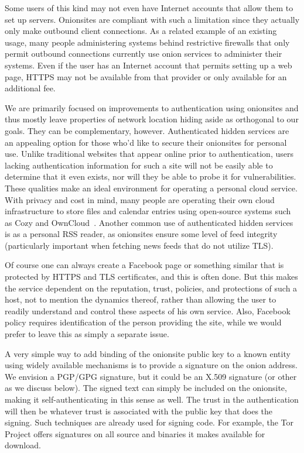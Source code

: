 \documentclass[10pt, conference, compsocconf]{styles/IEEEtran}
\begin{document}
Some users of this kind may not even have Internet accounts that allow 
them to set up servers. Onionsites are compliant with such a limitation
since they actually only make outbound client connections. As a related
example of an existing usage, many people administering systems
behind restrictive firewalls that only permit outbound connections
currently use onion services to administer their systems.  Even if the
user has an Internet account that permits setting up a web page, HTTPS
may not be available from that provider or only available for an
additional fee.

We are primarily focused on improvements to authentication using
onionsites and thus mostly leave properties of network location hiding
aside as orthogonal to our goals. They can be complementary, however.
Authenticated hidden services are an appealing option for those
who'd like to secure their onionsites for personal use.  Unlike
traditional websites that appear online prior to authentication,
users lacking authentication information for such a site will not be
easily able to
determine that it even exists, nor will they be able to probe it
for vulnerabilities.  These qualities make an ideal environment for
operating a personal cloud service.  With privacy and cost in mind,
many people are operating their own cloud infrastructure to store
files and calendar entries using open-source systems such as Cozy and
OwnCloud~\cite{cozy}.  Another common use of authenticated hidden
services is as  a personal RSS reader, as onionsites ensure some level
of feed integrity (particularly important when fetching news feeds
that do not utilize TLS).

Of course one can always create a Facebook page or something similar
that is protected by HTTPS and TLS certificates,
and this is often done.  But this makes the service dependent on the
reputation, trust, policies, and protections of such a host, not to mention
the dynamics thereof, rather than allowing the user to readily understand
and control these aspects of his own service. Also, Facebook
policy requires identification of the person providing the site,
while we would prefer to leave this as simply a separate issue.

A very simple way to add binding of the onionsite public key to
a known entity using widely available mechanisms is to provide a
signature on the onion address. We envision a PGP/GPG signature, but
it could be an X.509 signature (or other as we discuss below). 
The signed text can simply be
included on the onionsite, making it self-authenticating in this sense
as well. The trust in the authentication will then be whatever trust
is associated with the public key that does the signing. Such
techniques are already used for signing code. For example,
the Tor Project offers signatures on all source and binaries
it makes available for download. 
\end{document}

